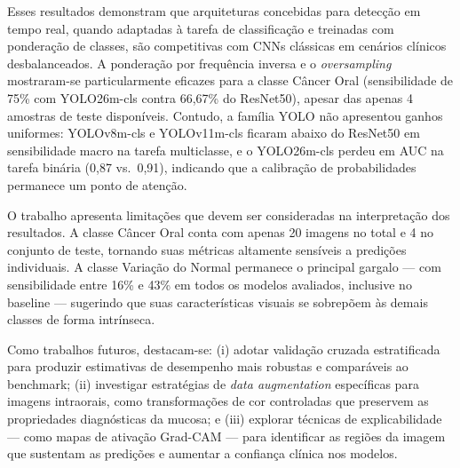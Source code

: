 \documentclass[12pt]{article}
\begin{document}
Esses resultados demonstram que arquiteturas concebidas para detecção
em tempo real, quando adaptadas à tarefa de classificação e treinadas
com ponderação de classes, são competitivas com CNNs clássicas em
cenários clínicos desbalanceados.
A ponderação por frequência inversa e o \textit{oversampling} mostraram-se
particularmente eficazes para a classe Câncer Oral
(sensibilidade de 75\% com YOLO26m-cls contra 66,67\% do ResNet50),
apesar das apenas 4 amostras de teste disponíveis.
Contudo, a família YOLO não apresentou ganhos uniformes: YOLOv8m-cls e
YOLOv11m-cls ficaram abaixo do ResNet50 em sensibilidade macro na
tarefa multiclasse, e o YOLO26m-cls perdeu em AUC na tarefa binária
(0,87 vs.\ 0,91), indicando que a calibração de probabilidades
permanece um ponto de atenção.

O trabalho apresenta limitações que devem ser consideradas na
interpretação dos resultados.
A classe Câncer Oral conta com apenas 20 imagens no total e 4 no
conjunto de teste, tornando suas métricas altamente sensíveis a
predições individuais.
A classe Variação do Normal permanece o principal gargalo — com
sensibilidade entre 16\% e 43\% em todos os modelos avaliados, inclusive
no baseline — sugerindo que suas características visuais se sobrepõem
às demais classes de forma intrínseca.

Como trabalhos futuros, destacam-se: (i) adotar validação cruzada
estratificada para produzir estimativas de desempenho mais robustas
e comparáveis ao benchmark; (ii) investigar estratégias de
\textit{data augmentation} específicas para imagens intraorais, como
transformações de cor controladas que preservem as propriedades
diagnósticas da mucosa; e (iii) explorar técnicas de explicabilidade
— como mapas de ativação Grad-CAM — para identificar as regiões da
imagem que sustentam as predições e aumentar a confiança clínica
nos modelos.



\end{document}
